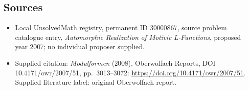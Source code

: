 \documentclass[11pt]{article}
\begin{document}
\subsection{Sources}
\begin{itemize}\item Local UnsolvedMath registry, permanent ID 30000867, source problem catalogue entry, \emph{Automorphic Realization of Motivic L-Functions}, proposed year 2007; no individual proposer supplied.\item Supplied citation: \emph{Modulformen} (2008), Oberwolfach Reports, DOI 10.4171/owr/2007/51, pp.\ 3013--3072: \url{https://doi.org/10.4171/owr/2007/51}. Supplied literature label: original Oberwolfach report.\end{itemize}
\end{document}
